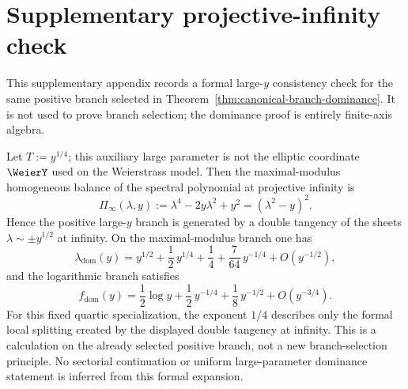 \section{Supplementary projective-infinity check}\label{app:projective-infinity}

This supplementary appendix records a formal large-$y$ consistency check for the same positive branch selected in Theorem~\ref{thm:canonical-branch-dominance}.  It is not used to prove branch selection; the dominance proof is entirely finite-axis algebra.

\begin{lemma}\label{lem:projective-infinity-consistency}
Let $T:=y^{1/4}$; this auxiliary large parameter is not the elliptic coordinate $\WeierY$ used on the Weierstrass model.
Then the maximal-modulus homogeneous balance of the spectral polynomial at projective infinity is
\begin{equation}\label{eq:infinity-balance}
\Pi_\infty(\lambda,y)
:=
\lambda^4-2y\lambda^2+y^2
=(\lambda^2-y)^2.
\end{equation}
Hence the positive large-\(y\) branch is generated by a double tangency of the sheets $\lambda\sim \pm y^{1/2}$ at infinity.
On the maximal-modulus branch one has
\begin{equation}\label{eq:lambda-high-y}
\lambda_{\mathrm{dom}}(y)
= y^{1/2} + \frac{1}{2}\,y^{1/4} + \frac{1}{4}
+ \frac{7}{64}\,y^{-1/4} + O(y^{-1/2}),
\end{equation}
and the logarithmic branch satisfies
\begin{equation}\label{eq:f-high-y}
f_{\mathrm{dom}}(y)
= \frac{1}{2}\log y + \frac{1}{2}\,y^{-1/4}
+ \frac{1}{8}\,y^{-1/2} + O(y^{-3/4}).
\end{equation}
For this fixed quartic specialization, the exponent $1/4$ describes only the formal local splitting created by the displayed double tangency at infinity.
This is a calculation on the already selected positive branch, not a new branch-selection principle.
No sectorial continuation or uniform large-parameter dominance statement is inferred from this formal expansion.
\end{lemma}

